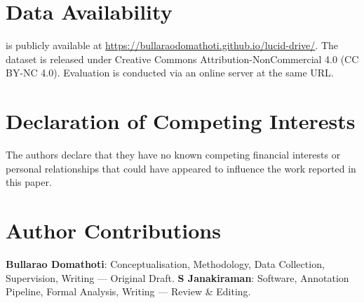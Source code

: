 \section*{Data Availability}

\lucid{} is publicly available at \url{https://bullaraodomathoti.github.io/lucid-drive/}. The dataset
is released under Creative Commons Attribution-NonCommercial 4.0 (CC BY-NC 4.0).
Evaluation is conducted via an online server at the same URL.

\section*{Declaration of Competing Interests}

The authors declare that they have no known competing financial interests or personal
relationships that could have appeared to influence the work reported in this paper.

\section*{Author Contributions}

\textbf{Bullarao Domathoti}: Conceptualisation, Methodology, Data Collection, Supervision, Writing --- Original Draft.
\textbf{S Janakiraman}: Software, Annotation Pipeline, Formal Analysis, Writing --- Review \& Editing.
